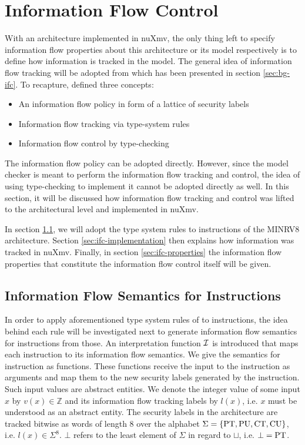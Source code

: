 
\chapter{Information Flow Control}
\label{chp:ifc}

With an architecture implemented in nuXmv, the only thing left to specify information flow properties about this architecture or its model respectively is to define how information is tracked in the model.
The general idea of information flow tracking will be adopted from \cite{Ferraiuolo17} which has been presented in section \ref{sec:bg-ifc}.
To recapture, \citeauthor{Ferraiuolo17} defined three concepts:
\begin{itemize}
    \item An information flow policy in form of a lattice of security labels
    \item Information flow tracking via type-system rules
    \item Information flow control by type-checking
\end{itemize}

The information flow policy can be adopted directly.
However, since the model checker is meant to perform the information flow tracking and control, the idea of using type-checking to implement it cannot be adopted directly as well.
In this section, it will be discussed how information flow tracking and control was lifted to the architectural level and implemented in nuXmv.

In section \ref{sec:ifc-model}, we will adopt the type system rules to instructions of the MINRV8 architecture.
Section \ref{sec:ifc-implementation} then explains how information was tracked in nuXmv.
Finally, in section \ref{sec:ifc-properties} the information flow properties that constitute the information flow control itself will be given.

\section{Information Flow Semantics for Instructions}
\label{sec:ifc-model}

In order to apply aforementioned type system rules of \cite{Ferraiuolo17} to instructions, the idea behind each rule will be investigated next to generate information flow semantics for instructions from those.
An interpretation function $ \mathcal{I} $ is introduced that maps each instruction to its information flow semantics.
We give the semantics for instruction as functions.
These functions receive the input to the instruction as arguments and map them to the new security labels generated by the instruction.
Such input values are abstract entities.
We denote the integer value of some input $ x $ by $ v(x) \in \mathbb{Z} $ and its information flow tracking labels by $ l(x) $, i.e. $ x $ must be understood as an abstract entity.
The security labels in the architecture are tracked bitwise as words of length 8 over the alphabet $ \Sigma = \{ \text{PT}, \text{PU}, \text{CT}, \text{CU} \} $, i.e. $ l(x) \in \Sigma^8 $.
$ \bot $ refers to the least element of $ \Sigma $ in regard to $ \sqcup $, i.e. $ \bot = \text{PT} $.

